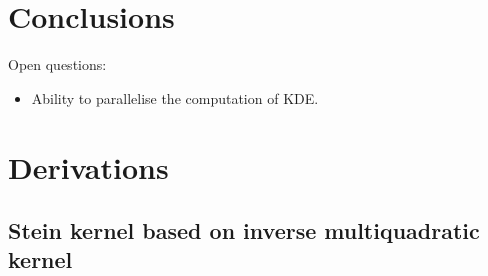 \documentclass[11pt,a4paper]{report}
\begin{document}
\chapter{Conclusions}
\label{sec:conclusions}

Open questions:
\begin{itemize}
\item Ability to parallelise the computation of KDE.
\end{itemize}




\appendix
\chapter{Derivations}
\label{appendix:derivations}

\section{Stein kernel based on inverse multiquadratic kernel}
\label{appendix:derivations:imq-stein}
\end{document}
